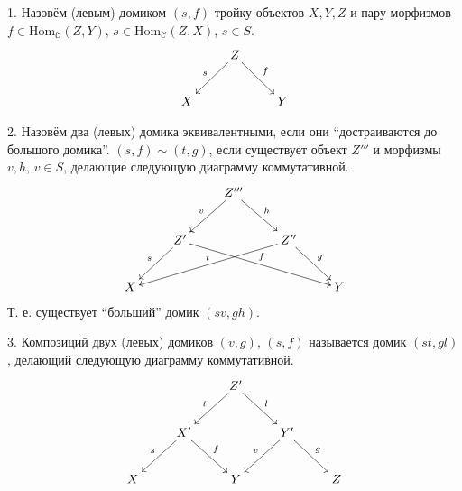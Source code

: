 \documentclass[../main.tex]{subfiles}
\begin{document}
     \begin{to_def}
      1. Назовём (левым) домиком $(s, f)$ тройку объектов $X, Y, Z$ и пару морфизмов $f\in \text{Hom}_\mathcal{C}(Z, Y)$, $s \in \text{Hom}_\mathcal{C}(Z, X)$, $s\in S$.
      \begin{equation}\label{sample_home}
	\xymatrix{&Z \ar[ld]_s \ar[rd]^f&\\
	X&&Y}
      \end{equation}

      2. Назовём два (левых) домика эквивалентными, если они ``достраиваются до большого домика''. $(s, f)\sim (t, g)$, если существует объект $Z'''$ и морфизмы $v, h$, $v\in S$, делающие следующую диаграмму коммутативной.
      \begin{equation}\label{home_equivalence}
	\xymatrix{&&Z'''\ar[ld]_v\ar[rd]^h&&\\
	  &Z'\ar[ld]_s\ar[rrrd]^f&&Z''\ar[llld]_t\ar[rd]^g&\\
	X&&&&Y}
      \end{equation}
      Т. е. существует ``больший'' домик $(sv, gh)$.
      \label{homescapes}

      3. Композиций двух (левых) домиков $(v, g)$, $(s, f)$ называется домик $(st, gl)$, делающий следующую диаграмму коммутативной.
	\begin{equation}\label{home_composition}
	\xymatrix{&&Z'\ar[ld]_t\ar[rd]^l&&\\
	  &X'\ar[ld]_s\ar[rd]^f&&Y'\ar[ld]_v\ar[rd]^g&\\
	X&&Y&&Z}
      \end{equation}

    \end{to_def}
\end{document}
